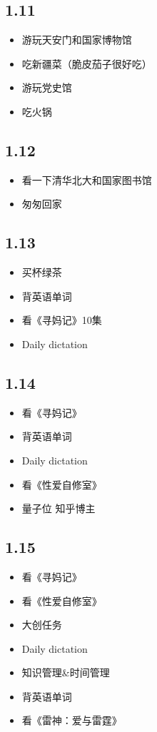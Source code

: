\documentclass[UTF8]{ctexart}
\begin{document}
\subsection*{1.11}
\begin{itemize}
    \item 游玩天安门和国家博物馆
    \item 吃新疆菜（脆皮茄子很好吃）
    \item 游玩党史馆
    \item 吃火锅
\end{itemize}
\subsection*{1.12}
\begin{itemize}
    \item 看一下清华北大和国家图书馆
    \item 匆匆回家
\end{itemize}
\subsection*{1.13}
\begin{itemize}
    \item 买杯绿茶
    \item 背英语单词
    \item 看《寻妈记》10集
    \item Daily dictation
\end{itemize}
\subsection*{1.14}
\begin{itemize}
    \item 看《寻妈记》
    \item 背英语单词
    \item Daily dictation
    \item 看《性爱自修室》
    \item 量子位 知乎博主
\end{itemize}
\subsection*{1.15}
\begin{itemize}
    \item 看《寻妈记》
    \item 看《性爱自修室》
    \item 大创任务
    \item Daily dictation
    \item 知识管理\&时间管理
    \item 背英语单词
    \item 看《雷神：爱与雷霆》
\end{itemize}
\end{document}
